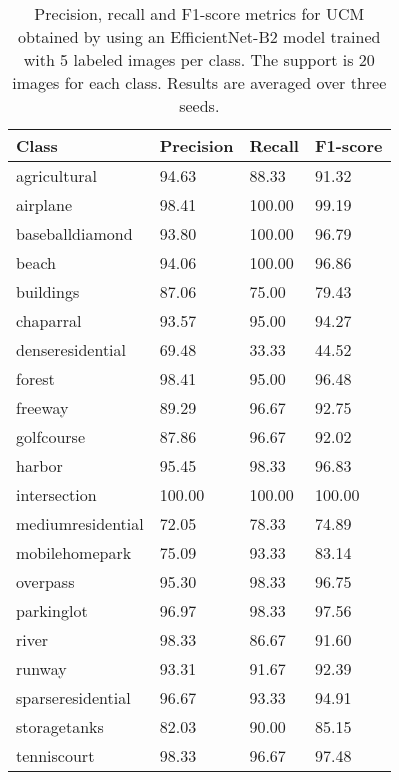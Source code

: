 \documentclass[journal]{IEEEtran}
\begin{document}
\begin{table}
\caption{Precision, recall and F1-score metrics for UCM obtained by using an EfficientNet-B2 model trained with 5 labeled images per class. The support is 20 images for each class. Results are averaged over three seeds.}
\begin{center}
 {\tabulinesep=0.5mm
\setlength\tabcolsep{2pt}
\begin{tabu} { |X[2]|| X[1c] | X[1c] | X[1c]|}
\hline
Class  & Precision & Recall & F1-score \\ \hline
agricultural      & 94.63	 &  88.33	& 91.32     \\ \hline
airplane          & 98.41	 &  100.00	& 99.19     \\ \hline
baseballdiamond   & 93.80	 &  100.00	& 96.79     \\ \hline
beach             & 94.06	 &  100.00	& 96.86       \\ \hline
buildings         & 87.06	 &  75.00	& 79.43     \\ \hline
chaparral         & 93.57	 &  95.00	& 94.27            \\ \hline
denseresidential  & 69.48	 &  33.33	& 44.52     \\ \hline
forest            & 98.41	 &  95.00	& 96.48     \\ \hline
freeway           & 89.29	 &  96.67	& 92.75    \\ \hline
golfcourse        & 87.86	 &  96.67	& 92.02    \\ \hline
harbor            & 95.45	 &  98.33	& 96.83    \\ \hline
intersection      & 100.00	& 100.00	&  100.00     \\ \hline
mediumresidential & 72.05	 &  78.33	& 74.89    \\ \hline
mobilehomepark    & 75.09	 &  93.33	& 83.14     \\ \hline
overpass          & 95.30	 &  98.33	& 96.75       \\ \hline
parkinglot        & 96.97	 &  98.33	& 97.56    \\ \hline
river             & 98.33	 &  86.67	& 91.60    \\ \hline
runway            & 93.31	 &  91.67	& 92.39    \\ \hline
sparseresidential & 96.67	 &  93.33	& 94.91       \\ \hline
storagetanks      & 82.03	 &  90.00	& 85.15      \\ \hline
tenniscourt       & 98.33	 &  96.67	& 97.48      \\ \hline
\end{tabu}}
\label{table:ucmMetrics}
\end{center}
\end{table}
\end{document}
